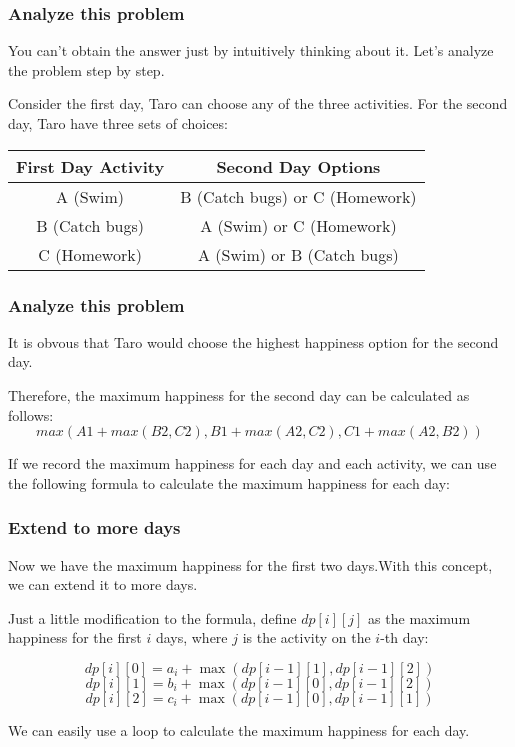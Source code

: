\documentclass[xcolor=dvipsnames]{beamer}
\begin{document}
    \begin{frame}
        \frametitle{Analyze this problem}
        You can't obtain the answer just by intuitively thinking about it.
        Let's analyze the problem step by step.

        Consider the first day, Taro can choose any of the three activities.
        For the second day, Taro have three sets of choices:
        \begin{tabular}{|c|c|}
            \hline
            \textbf{First Day Activity} & \textbf{Second Day Options} \\
            \hline
            A (Swim) & B (Catch bugs) or C (Homework) \\
            \hline
            B (Catch bugs) & A (Swim) or C (Homework) \\
            \hline
            C (Homework) & A (Swim) or B (Catch bugs) \\
            \hline
        \end{tabular}
        
    \end{frame}

    \begin{frame}
        \frametitle{Analyze this problem}
        It is obvous that Taro would choose the highest happiness option for the second day.

        Therefore, the maximum happiness for the second day can be calculated as follows:
        $$
        max(A1+max(B2, C2), B1+max(A2, C2), C1+max(A2, B2))
        $$

        If we record the maximum happiness for each day and each activity,
        we can use the following formula to calculate the maximum happiness for each day:
    \end{frame}

    \begin{frame}
        \frametitle{Extend to more days}
        Now we have the maximum happiness for the first two days.With this concept, we can extend it to more days.

        Just a little modification to the formula, define $dp[i][j]$ as the maximum happiness for the first $i$ days, where $j$ is the activity on the $i$-th day:

        $$ dp[i][0] = a_i + \max(dp[i-1][1], dp[i-1][2]) $$
        $$ dp[i][1] = b_i + \max(dp[i-1][0], dp[i-1][2]) $$
        $$ dp[i][2] = c_i + \max(dp[i-1][0], dp[i-1][1]) $$

        We can easily use a loop to calculate the maximum happiness for each day.
    \end{frame}
\end{document}
